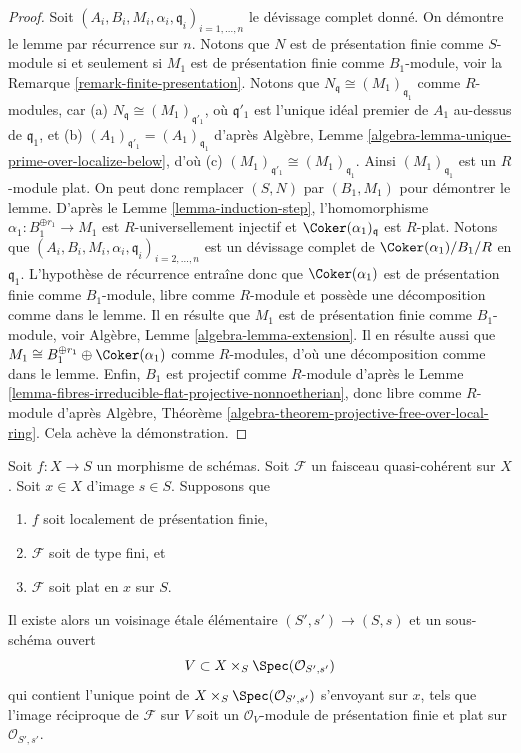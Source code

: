 \begin{proof}
Soit $(A_i, B_i, M_i, \alpha_i, \mathfrak q_i)_{i = 1, \ldots, n}$
le d\'evissage complet donné. On démontre le lemme par récurrence sur $n$.
Notons que $N$ est de présentation finie comme $S$-module si et seulement si
$M_1$ est de présentation finie comme $B_1$-module, voir
la Remarque \ref{remark-finite-presentation}.
Notons que $N_{\mathfrak q} \cong (M_1)_{\mathfrak q_1}$ comme $R$-modules,
car (a) $N_{\mathfrak q} \cong (M_1)_{\mathfrak q'_1}$, où
$\mathfrak q'_1$ est l'unique idéal premier de $A_1$ au-dessus de $\mathfrak q_1$,
et (b) $(A_1)_{\mathfrak q'_1} = (A_1)_{\mathfrak q_1}$ d'après
Algèbre, Lemme \ref{algebra-lemma-unique-prime-over-localize-below},
d'où (c) $(M_1)_{\mathfrak q'_1} \cong (M_1)_{\mathfrak q_1}$.
Ainsi $(M_1)_{\mathfrak q_1}$ est un $R$-module plat. On peut donc remplacer
$(S, N)$ par $(B_1, M_1)$ pour démontrer le lemme. D'après le
Lemme \ref{lemma-induction-step},
l'homomorphisme $\alpha_1 : B_1^{\oplus r_1} \to M_1$ est $R$-universellement injectif
et $\Coker(\alpha_1)_{\mathfrak q}$ est $R$-plat.
Notons que $(A_i, B_i, M_i, \alpha_i, \mathfrak q_i)_{i = 2, \ldots, n}$
est un d\'evissage complet de $\Coker(\alpha_1)/B_1/R$ en
$\mathfrak q_1$. L'hypothèse de récurrence
entraîne donc que $\Coker(\alpha_1)$ est de présentation finie comme
$B_1$-module, libre comme $R$-module et possède une décomposition comme dans le lemme.
Il en résulte que $M_1$ est de présentation finie comme $B_1$-module, voir
Algèbre, Lemme \ref{algebra-lemma-extension}.
Il en résulte aussi que
$M_1 \cong B_1^{\oplus r_1} \oplus \Coker(\alpha_1)$
comme $R$-modules, d'où une décomposition comme dans le lemme.
Enfin, $B_1$ est projectif comme $R$-module d'après le
Lemme \ref{lemma-fibres-irreducible-flat-projective-nonnoetherian},
donc libre comme $R$-module d'après
Algèbre, Théorème \ref{algebra-theorem-projective-free-over-local-ring}.
Cela achève la démonstration.
\end{proof}

\begin{proposition}
\label{proposition-finite-type-flat-at-point}
Soit $f : X \to S$ un morphisme de schémas.
Soit $\mathcal{F}$ un faisceau quasi-cohérent sur $X$.
Soit $x \in X$ d'image $s \in S$.
Supposons que
\begin{enumerate}
\item $f$ soit localement de présentation finie,
\item $\mathcal{F}$ soit de type fini, et
\item $\mathcal{F}$ soit plat en $x$ sur $S$.
\end{enumerate}
Il existe alors un voisinage \'etale élémentaire $(S', s') \to (S, s)$
et un sous-schéma ouvert
$$
V \subset X \times_S \Spec(\mathcal{O}_{S', s'})
$$
qui contient l'unique point de
$X \times_S \Spec(\mathcal{O}_{S', s'})$ s'envoyant sur $x$,
tels que l'image réciproque de $\mathcal{F}$ sur $V$ soit un $\mathcal{O}_V$-module
de présentation finie et plat sur $\mathcal{O}_{S', s'}$.
\end{proposition}

